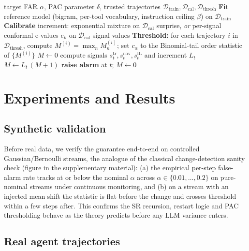 \documentclass[10pt,journal,compsoc]{IEEEtran}
\theoremstyle{plain}
\theoremstyle{definition}
\newcommand{\Dcal}{\mathcal{D}}
\begin{document}
\begin{algorithm}[!t]
\caption{SENTRY-Detect}\label{alg:sentry}
\begin{algorithmic}[1]
\Require target FAR \(\alpha\), PAC parameter \(\delta\), trusted trajectories
\(\Dcal_{\mathrm{train}},\Dcal_{\mathrm{cal}},\Dcal_{\mathrm{thresh}}\)
\State \textbf{Fit} reference model (bigram, per-tool vocabulary,
instruction ceiling \(\beta\)) on \(\Dcal_{\mathrm{train}}\)
\State \textbf{Calibrate} increment: exponential mixture on
\(\Dcal_{\mathrm{cal}}\) surprise, \emph{or} per-signal conformal e-values
\(e_k\) on \(\Dcal_{\mathrm{cal}}\) signal values
\State \textbf{Threshold:} for each trajectory \(i\) in
\(\Dcal_{\mathrm{thresh}}\), compute \(M^{(i)}=\max_n M^{(i)}_n\); set
\(c_\alpha\) to the Binomial-tail order statistic of \(\{M^{(i)}\}\)
\State \(M\gets 0\)
  \State compute signals \(s^{\mathrm{tr}}_t, s^{\mathrm{nov}}_t, s^{\mathrm{IL}}_t\)
  and increment \(L_t\)
  \State \(M \gets L_t\,(M+1)\) 
     \State \textbf{raise alarm} at \(t\); \(M\gets 0\) 
  \EndIf
\EndFor
\end{algorithmic}
\end{algorithm}

\section{Experiments and Results}\label{sec:experiments}

\subsection{Synthetic validation}

Before real data, we verify the guarantee end-to-end on controlled
Gaussian/Bernoulli streams, the analogue of the classical change-detection
sanity check (figure in the supplementary material): (a) the empirical per-step
false-alarm rate tracks at or below the nominal \(\alpha\) across
\(\alpha\in\{0.01,\dots,0.2\}\) on pure-nominal streams under continuous
monitoring, and (b) on a stream with an injected mean shift the statistic is
flat before the change and crosses threshold within a few steps after. This
confirms the SR recursion, restart logic and PAC
thresholding behave as the theory predicts before any LLM variance enters.

\subsection{Real agent trajectories}
\end{document}
